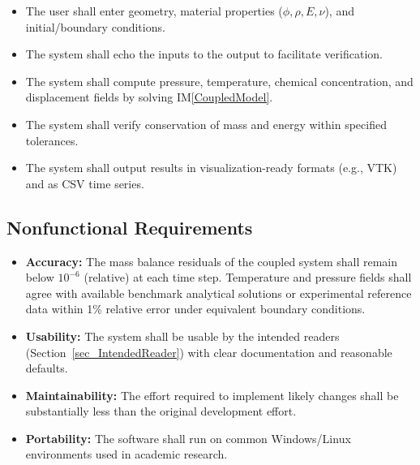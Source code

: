 \documentclass[12pt]{article}
\newcounter{reqnum} %
\newcounter{nfrnum} %
\begin{document}
\begin{itemize}
\item[R\refstepcounter{reqnum}\thereqnum \label{R_Inputs}:]
The user shall enter geometry, material properties ($\phi, \rho, E, \nu$), and initial/boundary conditions.

\item[R\refstepcounter{reqnum}\thereqnum \label{R_OutputInputs}:]
The system shall echo the inputs to the output to facilitate verification.

\item[R\refstepcounter{reqnum}\thereqnum \label{R_Calculate}:]
The system shall compute pressure, temperature, chemical concentration, and displacement fields by solving IM\ref{CoupledModel}.

\item[R\refstepcounter{reqnum}\thereqnum \label{R_VerifyOutput}:]
The system shall verify conservation of mass and energy within specified tolerances.

\item[R\refstepcounter{reqnum}\thereqnum \label{R_Output}:]
The system shall output results in visualization-ready formats (e.g., VTK) and as CSV time series.
\end{itemize}

\subsection{Nonfunctional Requirements}

\begin{itemize}
\item[NFR\refstepcounter{nfrnum}\thenfrnum \label{NFR_Accuracy}:]
\textbf{Accuracy:} The mass balance residuals of the coupled system shall remain below $10^{-6}$ (relative) at each time step. Temperature and pressure fields shall agree with available benchmark analytical solutions or experimental reference data within 1\% relative error under equivalent boundary conditions.

\item[NFR\refstepcounter{nfrnum}\thenfrnum \label{NFR_Usability}:]
\textbf{Usability:} The system shall be usable by the intended readers (Section~\ref{sec_IntendedReader}) with clear documentation and reasonable defaults.

\item[NFR\refstepcounter{nfrnum}\thenfrnum \label{NFR_Maintainability}:]
\textbf{Maintainability:} The effort required to implement likely changes shall be substantially less than the original development effort.

\item[NFR\refstepcounter{nfrnum}\thenfrnum \label{NFR_Portability}:]
\textbf{Portability:} The software shall run on common Windows/Linux environments used in academic research.
\end{itemize}
\end{document}

